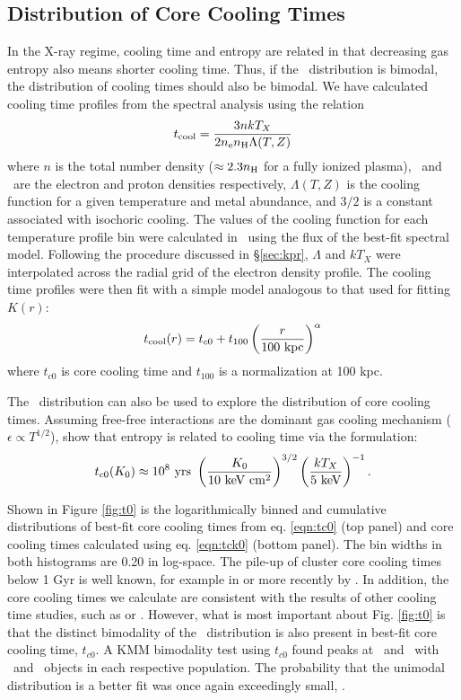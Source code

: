 \documentclass[12pt,preprint]{aastex}
\begin{document}
\subsection{Distribution of Core Cooling Times}
\label{sec:hifl}

In the X-ray regime, cooling time and entropy are related in that
decreasing gas entropy also means shorter cooling time. Thus, if the
\kna\ distribution is bimodal, the distribution of cooling times
should also be bimodal. We have calculated cooling time profiles from
the spectral analysis using the relation
\begin{equation}
t_{\mathrm{cool}} = \frac{3nkT_X}{2n_{\mathrm{e}} n_{\mathrm{H}} \Lambda(T,Z)}
\label{eqn:tcool}
\end{equation}
where $n$ is the total number density ($\approx 2.3n_{\mathrm{H}}$ for a fully
ionized plasma), \nelec\ and \nH\ are the electron and proton
densities respectively, $\Lambda(T,Z)$ is the cooling function for a
given temperature and metal abundance, and $3/2$ is a constant
associated with isochoric cooling. The values of the cooling function
for each temperature profile bin were calculated in \xspec\ using the
flux of the best-fit spectral model. Following the procedure discussed
in \S\ref{sec:kpr}, $\Lambda$ and $kT_X$ were interpolated across the
radial grid of the electron density profile. The cooling time profiles
were then fit with a simple model analogous to that used for fitting
$K(r)$:
\begin{equation}
t_{\mathrm{cool}}(r) = t_{c0} + t_{100} \left(\frac{r}{100 \mbox{\ensuremath{\mathrm{~kpc}}}}\right)^{\alpha}
\label{eqn:tc0}
\end{equation}
where $t_{c0}$ is core cooling time and $t_{100}$ is a normalization
at 100 kpc.

The \kna\ distribution can also be used to explore the distribution of
core cooling times. Assuming free-free interactions are the dominant
gas cooling mechanism (\ie\ $\epsilon \propto T^{1/2}$),
\citet{radioquiet} show that entropy is related to cooling time via
the formulation:
\begin{equation}
t_{c0}(\kna) \approx 10^8 \yrs\ \left(\frac{\kna}{10 \keV \cmsq}\right)^{3/2} \left(\frac{kT_X}{5 \keV}\right)^{-1}.
\label{eqn:tck0}
\end{equation}

Shown in Figure \ref{fig:t0} is the logarithmically binned and
cumulative distributions of best-fit core cooling times from
eq. \ref{eqn:tc0} (top panel) and core cooling times calculated using
eq. \ref{eqn:tck0} (bottom panel). The bin widths in both histograms
are 0.20 in log-space. The pile-up of cluster core cooling times below
1 Gyr is well known, for example in \citet{hu85} or more recently by
\citet{dunn08}. In addition, the core cooling times we calculate are
consistent with the results of other cooling time studies, such as
\citet{1998MNRAS.298..416P} or \citet{2008arXiv0802.1864R}. However,
what is most important about Fig. \ref{fig:t0} is that the distinct
bimodality of the \kna\ distribution is also present in best-fit core
cooling time, $t_{c0}$. A KMM bimodality test using $t_{c0}$ found
peaks at \tckmma\ and \tckmmb\ with \tckmmc\ and \tckmmd\ objects in
each respective population. The probability that the unimodal
distribution is a better fit was once again exceedingly small,
\tckmme.
\end{document}
